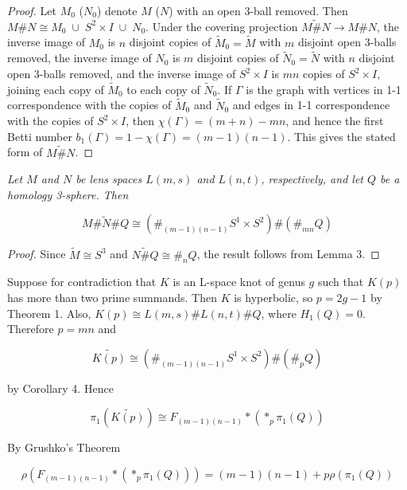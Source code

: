 \documentclass[12pt]{amsart}
\begin{document}
\begin{proof}

  Let $M_0$ ($N_0$) denote $M$ ($N$) with an open 3-ball removed. Then $M\#N \cong M_0 \;\cup\; S^2 \times I\; \cup\; N_0$. Under the covering projection $\widetilde{M\#N} \to M\#N$, the inverse image of $M_0$ is $n$ disjoint copies of $\tilde{M}_0 = \tilde{M}$ with $m$ disjoint open 3-balls removed, the inverse image of $N_0$ is $m$ disjoint copies of $\tilde{N}_0 = \tilde{N}$ with $n$ disjoint open 3-balls removed, and the inverse image of $S^2 \times I$ is $mn$ copies of $S^2 \times I$, joining each copy of $\tilde{M}_0$ to each copy of $\tilde{N}_0$. If $\Gamma$ is the graph with vertices in 1-1 correspondence with the copies of $\tilde{M}_0$ and $\tilde{N}_0$ and edges in 1-1 correspondence with the copies of $S^2 \times I$, then $\chi(\Gamma) = (m+n) - mn$, and hence the first Betti number $b_1(\Gamma) = 1 - \chi(\Gamma) = (m-1)(n-1)$. This gives the stated form of $\widetilde{M\#N}$.
\end{proof}

\smallskip

{\it Let $M$ and $N$ be lens spaces $L(m,s)$ and $L(n,t)$, respectively, and let $Q$ be a homology 3-sphere. Then 

$$\widetilde{M\#N\#Q} \cong (\#_{(m-1)(n-1)} S^1 \times S^2) \# (\#_{mn} Q)$$}

\begin{proof}

  Since $\tilde M \cong S^3$ and $\widetilde{N\#Q} \cong \#_{n} Q$, the result follows from Lemma 3.
\end{proof}
\medskip


\medskip

  Suppose for contradiction that $K$ is an L-space knot of genus $g$ such that $K(p)$ has more than two prime summands. Then $K$ is hyperbolic, so $p = 2g - 1$ by Theorem 1. Also, $K(p) \cong L(m,s) \# L(n,t) \# Q$, where $H_1(Q) = 0$. Therefore $p = mn$ and

  $$\widetilde{K(p)} \cong (\#_{(m-1)(n-1)} S^1 \times S^2) \# (\#_{p} Q)$$

  by Corollary 4. Hence

  $$\pi_1(\widetilde{K(p)}) \cong F_{(m-1)(n-1)} \ast (\ast_{p} \pi_1(Q))$$
  \medskip
  
  By Grushko's Theorem

 $$\rho(F_{(m-1)(n-1)} \ast (\ast_{p} \pi_1(Q))) = (m-1)(n-1) + p \rho(\pi_1(Q))$$
 \medskip
\end{document}
